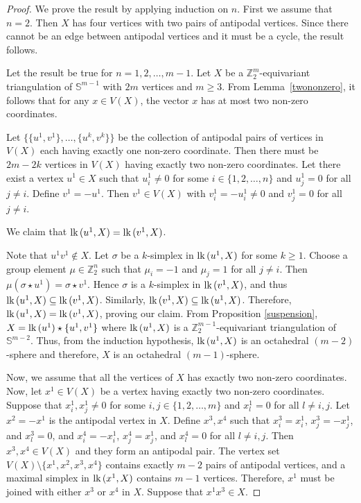 \documentclass[11pt]{amsart}
\numberwithin{equation}{section}
\theoremstyle{definition}
\newcommand{\lk}{\mbox{\upshape lk}\,}
\newcommand{\Sp}{\mathbb{S}}
\def \bb{\mathbb}
\def \ZZ{{\bb{Z}}}
\begin{document}
\begin{proof}
We prove the result by applying induction on $n$.  First we assume that $n=2$. Then $X$ has four vertices with two pairs of antipodal vertices. Since there cannot be an edge between antipodal vertices and it must be a cycle, the result follows. 

Let the result be true for $n=1,2,\dots,m-1$. Let $X$ be a $\ZZ^{m}_2$-equivariant triangulation of $\Sp^{m-1}$ with $2m$ vertices and $m\geq 3$. From Lemma~\ref{twononzero}, it follows that for any $x \in V(X)$, the vector $x$ has at most two non-zero coordinates.

Let $\{\{u^1, v^1\}, \ldots, \{u^k, v^k\}\}$ be the collection of antipodal pairs of vertices in $V(X)$ each having exactly one non-zero coordinate. Then there must be $2m - 2k$ vertices in $V(X)$ having exactly two non-zero coordinates. Let there exist a vertex $u^1 \in X$ such that $u_i^1 \neq 0$ for some $i \in \{1,2,\ldots,n\}$ and $u_j^1 = 0$ for all $j \neq i$. Define $v^1 = -u^1$. Then $v^1 \in V(X)$ with $v_i^1 = -u_i^1 \neq 0$ and $v_j^1 = 0$ for all $j \neq i$.

We claim that $\lk(u^1, X) = \lk(v^1, X)$.

Note that $u^1 v^1 \notin X$. Let $\sigma$ be a $k$-simplex in $\lk(u^1, X)$ for some $k \geq 1$. Choose a group element $\mu \in \ZZ_2^n$ such that $\mu_i = -1$ and $\mu_j = 1$ for all $j \neq i$. Then $\mu(\sigma \star u^1) = \sigma \star v^1$. Hence $\sigma$ is a $k$-simplex in $\lk(v^1, X)$, and thus $\lk(u^1, X) \subseteq \lk(v^1, X)$. Similarly, $\lk(v^1, X) \subseteq \lk(u^1, X)$. Therefore, $\lk(u^1, X) = \lk(v^1, X)$, proving our claim. From Proposition \ref{suspension}, $X=\lk(u^1)\star\{u^1,v^1\}$ where $\lk(u^1,X)$ is a $\ZZ^{m-1}_2$-equivariant triangulation of $\Sp^{m-2}$. Thus, from the induction hypothesis, $\lk(u^1,X)$ is an octahedral $(m-2)$-sphere and therefore, $X$ is an octahedral $(m-1)$-sphere. 



Now, we assume that all the vertices of $X$
has exactly two non-zero coordinates.
Now, let $x^1 \in V(X)$ be a vertex having exactly two non-zero coordinates. Suppose that $x_i^1, x_j^1 \neq 0$ for some $i, j \in \{1, 2, \ldots, m\}$ and $x_l^1 = 0$ for all $l \neq i, j$. Let $x^2 = -x^1$ is the antipodal vertex in $X$. Define $x^3, x^4$ such that $x_i^3 = x_i^1$, $x_j^3 = -x_j^1$, and $x_l^3 = 0$, and $x_i^4 = -x_i^1$, $x_j^4 = x_j^1$, and $x_l^4 = 0$ for all $l \neq i,j$. Then $x^3, x^4 \in V(X)$ and they form an antipodal pair. The vertex set $V(X) \setminus \{x^1, x^2, x^3, x^4\}$ contains exactly $m - 2$ pairs of antipodal vertices, and a maximal simplex in $\lk(x^1, X)$ contains $m  - 1$ vertices. Therefore, $x^1$ must be joined with either $x^3$ or $x^4$ in $X$. Suppose that $x^1 x^3 \in X$.


\end{proof}
\end{document}
